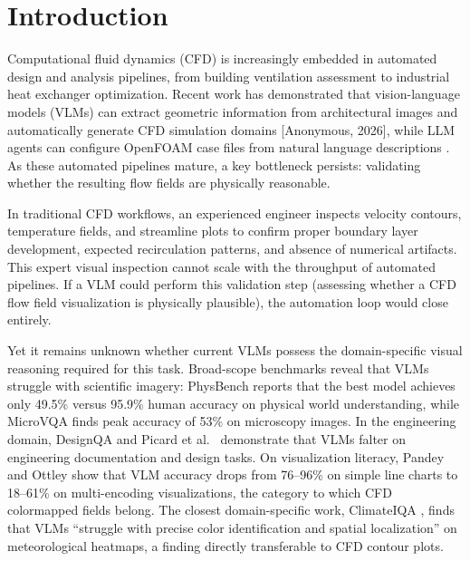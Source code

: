 \documentclass[preprint,12pt]{elsarticle}
\begin{document}

\section{Introduction}

Computational fluid dynamics (CFD) is increasingly embedded in automated design and
analysis pipelines, from building ventilation assessment
\cite{calzolari.liu2021DeepLearning,ding.lam2019DatadrivenModel} to industrial heat exchanger optimization.
Recent work has demonstrated that vision-language models (VLMs) can extract geometric
information from architectural images and automatically generate CFD simulation
domains [Anonymous, 2026], while LLM agents can configure OpenFOAM case files
from natural language descriptions \cite{pandey.etal2025OpenFOAMGPTRetrievalaugmented,dong.etal2025FinetuningLarge}.
As these automated pipelines mature, a key bottleneck persists: validating
whether the resulting flow fields are physically reasonable.

In traditional CFD workflows, an experienced engineer inspects velocity contours,
temperature fields, and streamline plots to confirm proper boundary layer
development, expected recirculation patterns, and absence of numerical artifacts.
This expert visual inspection cannot scale with the throughput of automated
pipelines. If a VLM could perform this validation step (assessing whether a CFD
flow field visualization is physically plausible), the automation loop would close
entirely.

Yet it remains unknown whether current VLMs possess the domain-specific visual
reasoning required for this task. Broad-scope benchmarks reveal that VLMs struggle
with scientific imagery: PhysBench \cite{chow.etal2025PhysBenchBenchmarking} reports that the best
model achieves only 49.5\% versus 95.9\% human accuracy on physical world
understanding, while MicroVQA \cite{burgess.etal2025MicroVQAMultimodal} finds peak accuracy of
53\% on microscopy images. In the engineering domain, DesignQA
\cite{doris.etal2024DesignQAMultimodal} and Picard et al.\ \cite{picard.etal2025ConceptManufacturing} demonstrate
that VLMs falter on engineering documentation and design tasks. On visualization
literacy, Pandey and Ottley \cite{pandey.ottley2025BenchmarkingVisionLanguage} show that VLM
accuracy drops from 76--96\% on simple line charts to 18--61\% on multi-encoding
visualizations, the category to which CFD colormapped fields belong. The closest
domain-specific work, ClimateIQA \cite{chen.etal2024ClimateIQAMultimodal}, finds that VLMs
``struggle with precise color identification and spatial localization'' on
meteorological heatmaps, a finding directly transferable to CFD contour plots.
\end{document}
